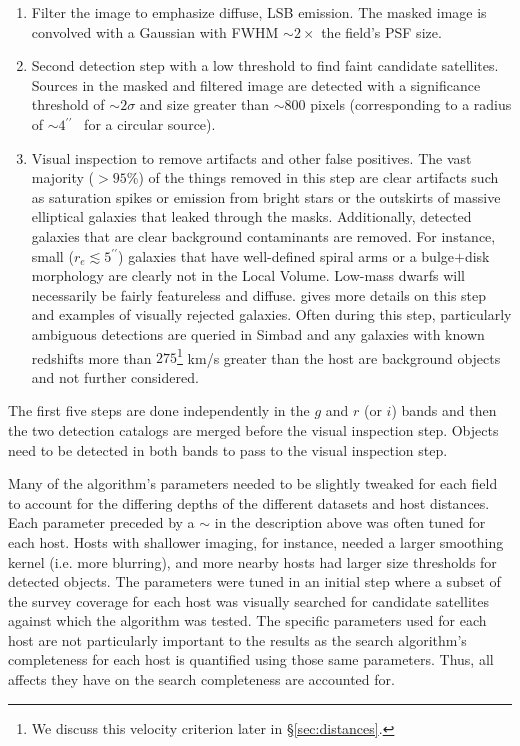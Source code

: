 \documentclass[twocolumn]{aastex62}
\newcommand{\arcs}{$^{\prime\prime}$} %
\begin{document}
\begin{enumerate}
    \item Filter the image to emphasize diffuse, LSB emission. The masked image is convolved with a Gaussian with FWHM $\sim2\times$ the field's PSF size. 
    
    \item Second detection step with a low threshold to find faint candidate satellites. Sources in the masked and filtered image are detected with a significance threshold of $\sim2\sigma$ and size greater than $\sim800$ pixels (corresponding to a radius of $\sim 4$\arcs~ for a circular source). 
    
    \item Visual inspection to remove artifacts and other false positives. The vast majority ($>95\%$) of the things removed in this step are clear artifacts such as saturation spikes or emission from bright stars or the outskirts of massive elliptical galaxies that leaked through the masks. Additionally, detected galaxies that are clear background contaminants are removed. For instance, small ($r_e \lesssim 5$\arcs) galaxies that have well-defined spiral arms or a bulge$+$disk morphology are clearly not in the Local Volume. Low-mass dwarfs will necessarily be fairly featureless and diffuse. \citet{carlsten2020a} gives more details on this step and examples of visually rejected galaxies. Often during this step, particularly ambiguous detections are queried in Simbad and any galaxies with known redshifts more than $275$\footnote{We discuss this velocity criterion later in \S\ref{sec:distances}.} km/s greater than the host are background objects and not further considered. 
    
\end{enumerate}


The first five steps are done independently in the $g$ and $r$ (or $i$) bands and then the two detection catalogs are merged before the visual inspection step. Objects need to be detected in both bands to pass to the visual inspection step.

Many of the algorithm's parameters needed to be slightly tweaked for each field to account for the differing depths of the different datasets and host distances. Each parameter preceded by a $\sim$ in the description above was often tuned for each host. Hosts with shallower imaging, for instance, needed a larger smoothing kernel (i.e. more blurring), and more nearby hosts had larger size thresholds for detected objects. The parameters were tuned in an initial step where a subset of the survey coverage for each host was visually searched for candidate satellites against which the algorithm was tested. The specific parameters used for each host are not particularly important to the results as the search algorithm's completeness for each host is quantified using those same parameters. Thus, all affects they have on the search completeness are accounted for. 
\end{document}
